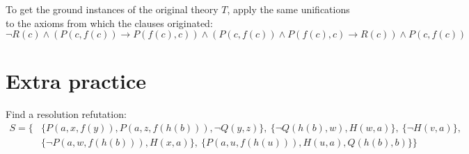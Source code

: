 \begin{problem}
\begin{solution}
\begin{enumerate}[(a)]
            \begin{minipage}{0.6\textwidth}
            \end{minipage}%
            \begin{minipage}{0.35\textwidth}
            \end{minipage} 
            To get the ground instances of the original theory $T$, apply the same unifications to the axioms from which the clauses originated:
            $$
            \neg R(c)\land (P(c,f(c))\to P(f(c),c))\land (P(c,f(c))\land P(f(c),c)\to R(c))\land P(c,f(c))
            $$


        \end{enumerate}

    \end{solution}

\end{problem}

        
\section*{Extra practice}


\begin{problem}
    Find a resolution refutation: 
    \begin{align*}
        S=\{
            &\{P(a,x,f(y)),P(a,z,f(h(b))),\neg Q(y,z)\},\
            \{\neg Q(h(b),w),H(w,a)\},\ 
            \{\neg H(v,a)\},\\
            &\{\neg P(a,w,f(h(b))),H(x,a)\},\
            \{P(a,u,f(h(u))),H(u,a),Q(h(b),b)\}            
        \}
    \end{align*}
\end{problem}


